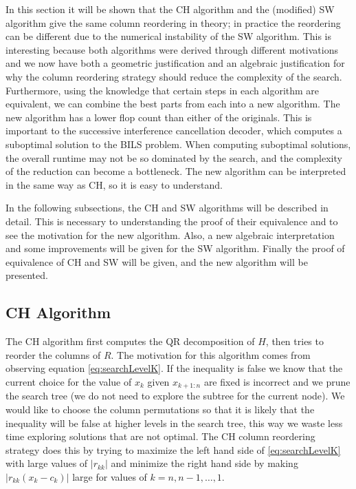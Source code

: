 \documentclass[12pt,Bold,letterpaper]{mcgilletdclass}
\newcommand{\vsp}{\vspace{\baselineskip}}
\begin{document}
In this section it will be shown that the CH algorithm and the  (modified)  SW algorithm give the same
column reordering in theory; in practice the reordering can be different due to the numerical instability of the SW algorithm. This is interesting because both algorithms were derived through different motivations
and we now have both a geometric justification and an algebraic justification 
for why the column reordering strategy should reduce the complexity of the search.
Furthermore, using the knowledge that certain steps in each algorithm are equivalent,
we can combine the best parts from each into a new algorithm. The new algorithm
has a lower flop count than either of the originals.
This is important to the successive interference cancellation decoder, 
which computes a suboptimal solution to the BILS problem. When computing suboptimal solutions, the overall runtime may not be so dominated by the search, and the complexity of the reduction can become a bottleneck.
The new algorithm can be interpreted in the same way as CH,
so it is easy to understand. 

In the following subsections, the CH and SW algorithms will be described in detail. This is necessary to understanding the proof of their equivalence and to see the motivation for the new algorithm. Also, a new algebraic interpretation and some improvements will be given for the SW algorithm. Finally the proof of equivalence of CH and SW will be given, and the new algorithm will be presented.

\vsp \subsection{CH Algorithm} \label{subsec:CH}
The CH algorithm first computes the QR decomposition of $H$,
then  tries to reorder the columns of $R$.
The motivation for this algorithm comes from observing equation \eqref{eq:searchLevelK}.
If the inequality is false we know that the current choice for the value of
$x_k$ given $x_{k+1:n}$ are fixed is incorrect and we prune the search tree (we do not need to explore the subtree for the current node). We
would like to choose the column permutations so that it is likely that the
inequality will be false at higher levels in the search tree, this way we waste less time exploring solutions that are not optimal. The CH column reordering strategy
does this by trying to maximize the left hand side of  \eqref{eq:searchLevelK} with large values of $\left | r_{kk}
\right |$ and minimize the right hand side by making $\left | r_{kk}(x_k-c_k) \right |$
large for values of $k = n,n-1, \dots, 1$.
\end{document}

